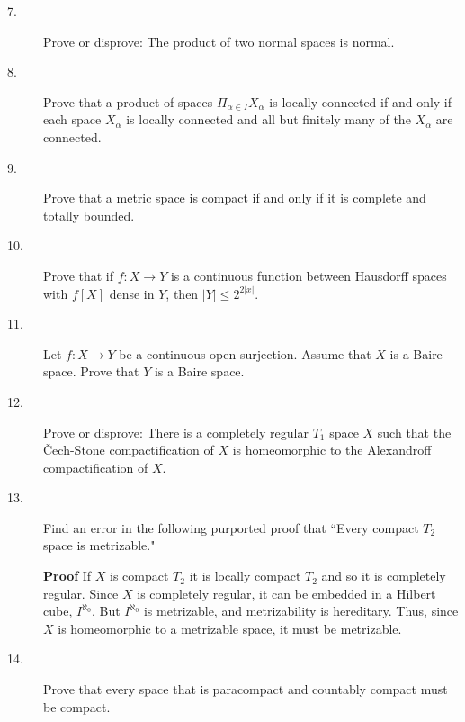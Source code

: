 \documentclass{article}
\begin{document}
\begin{description}
\item[7.]
Prove or disprove: The product of two normal spaces is normal.

\item[8.]
Prove that a product of spaces $\Pi_{\alpha \in I} X_\alpha$ is locally
connected if and only if each space $X_\alpha$ is locally connected and all
but finitely many of the $X_\alpha$ are connected.

\item[9.]
Prove that a metric space is compact if and only if it is complete and
totally bounded.

\item[10.]
Prove that if $f: X \to Y$ is a continuous function between
Hausdorff spaces with $f[X]$ dense in $Y$, then $|Y| \leq 2^{2|x|}$.

\item[11.]
Let $f: X \to Y$ be a continuous open surjection. Assume that $X$ is a
Baire space. Prove that $Y$ is a Baire space.

\item[12.]
Prove or disprove: There is a completely regular $T_1$ space $X$ such that
the \v Cech-Stone compactification of $X$ is homeomorphic to the
Alexandroff compactification of $X$.

\item[13.]
Find an error in the following purported proof that ``Every compact $T_2$
space is metrizable."

{\bf Proof} If $X$ is compact $T_2$ it is locally compact $T_2$ and so it
is completely regular. Since $X$ is completely regular, it can be embedded
in a Hilbert cube, $I^{\aleph_0}$. But $I^{\aleph_0}$ is metrizable, and
metrizability is hereditary. Thus, since $X$ is homeomorphic to a metrizable
space, it must be metrizable.

\item[14.]
Prove that every space that is paracompact and countably compact must be
compact.




    
\end{description}
\end{document}

